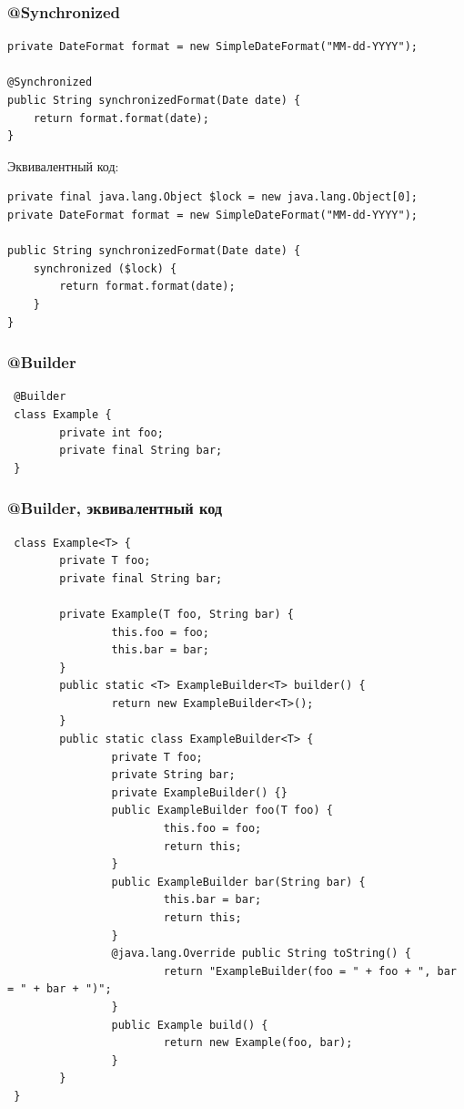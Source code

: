 \documentclass[xetex,mathserif,serif]{beamer}
\begin{document}
	\begin{frame}[fragile]
		\frametitle{@Synchronized}
		\begin{small}
			\begin{verbatim}
private DateFormat format = new SimpleDateFormat("MM-dd-YYYY");

@Synchronized
public String synchronizedFormat(Date date) {
    return format.format(date);
}
		\end{verbatim}
		Эквивалентный код:
		\begin{verbatim}
private final java.lang.Object $lock = new java.lang.Object[0];
private DateFormat format = new SimpleDateFormat("MM-dd-YYYY");

public String synchronizedFormat(Date date) {
    synchronized ($lock) {  
        return format.format(date);
    }
}
			\end{verbatim}
		\end{small}
\end{frame}

	\begin{frame}[fragile]
		\frametitle{@Builder}
		\begin{verbatim}
 @Builder
 class Example {
        private int foo;
        private final String bar;
 }
		\end{verbatim}
\end{frame}

	\begin{frame}[fragile]
		\frametitle{@Builder, эквивалентный код}
		\begin{tiny}
			\begin{verbatim}
 class Example<T> {
        private T foo;
        private final String bar;
        
        private Example(T foo, String bar) {
                this.foo = foo;
                this.bar = bar;
        }        
        public static <T> ExampleBuilder<T> builder() {
                return new ExampleBuilder<T>();
        }        
        public static class ExampleBuilder<T> {
                private T foo;
                private String bar;
                private ExampleBuilder() {}
                public ExampleBuilder foo(T foo) {
                        this.foo = foo;
                        return this;
                }                
                public ExampleBuilder bar(String bar) {
                        this.bar = bar;
                        return this;
                }                
                @java.lang.Override public String toString() {
                        return "ExampleBuilder(foo = " + foo + ", bar = " + bar + ")";
                }                
                public Example build() {
                        return new Example(foo, bar);
                }
        }
 } 
			\end{verbatim}
		\end{tiny}
\end{frame}
\end{document}
